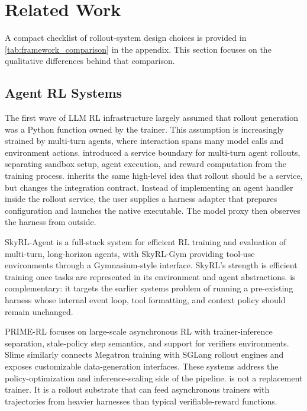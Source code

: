 \section{Related Work}

A compact checklist of rollout-system design choices is provided in \cref{tab:framework_comparison} in the appendix. This section focuses on the qualitative differences behind that comparison.

\subsection{Agent RL Systems}

The first wave of LLM RL infrastructure largely assumed that rollout generation was a Python function owned by the trainer. This assumption is increasingly strained by multi-turn agents, where interaction spans many model calls and environment actions. \prorlagent \citep{prorlagent2026} introduced a service boundary for multi-turn agent rollouts, separating sandbox setup, agent execution, and reward computation from the training process. \polar inherits the same high-level idea that rollout should be a service, but changes the integration contract. Instead of implementing an agent handler inside the rollout service, the user supplies a harness adapter that prepares configuration and launches the native executable. The model proxy then observes the harness from outside.

SkyRL-Agent \citep{skyrlagent2025} is a full-stack system for efficient RL training and evaluation of multi-turn, long-horizon agents, with SkyRL-Gym providing tool-use environments through a Gymnasium-style interface. SkyRL's strength is efficient training once tasks are represented in its environment and agent abstractions. \polar is complementary: it targets the earlier systems problem of running a pre-existing harness whose internal event loop, tool formatting, and context policy should remain unchanged.

PRIME-RL \citep{primerl2026} focuses on large-scale asynchronous RL with trainer-inference separation, stale-policy step semantics, and support for verifiers environments. Slime \citep{slime2025,sglang2024} similarly connects Megatron training with SGLang rollout engines and exposes customizable data-generation interfaces. These systems address the policy-optimization and inference-scaling side of the pipeline. \polar is not a replacement trainer. It is a rollout substrate that can feed asynchronous trainers with trajectories from heavier harnesses than typical verifiable-reward functions.

